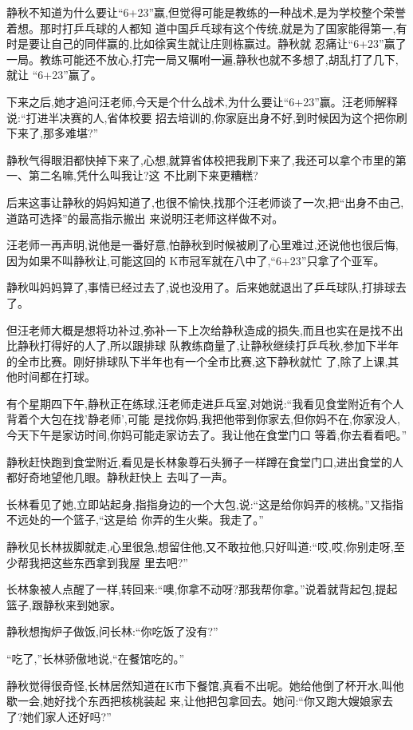 ﻿\documentclass[12pt]{article}
\begin{document}
静秋不知道为什么要让``6+23''赢,但觉得可能是教练的一种战术,是为学校整个荣誉着想。那时打乒乓球的人都知
道中国乒乓球有这个传统,就是为了国家能得第一,有时是要让自己的同伴赢的,比如徐寅生就让庄则栋赢过。静秋就
忍痛让``6+23''赢了一局。教练可能还不放心,打完一局又嘱咐一遍,静秋也就不多想了,胡乱打了几下,就让
``6+23''赢了。

下来之后,她才追问汪老师,今天是个什么战术,为什么要让``6+23''赢。汪老师解释说:``打进半决赛的人,省体校要
招去培训的,你家庭出身不好,到时候因为这个把你刷下来了,那多难堪?''

静秋气得眼泪都快掉下来了,心想,就算省体校把我刷下来了,我还可以拿个市里的第一、第二名嘛,凭什么叫我让?这
不比刷下来更糟糕?

后来这事让静秋的妈妈知道了,也很不愉快,找那个汪老师谈了一次,把``出身不由己,道路可选择''的最高指示搬出
来说明汪老师这样做不对。

汪老师一再声明,说他是一番好意,怕静秋到时候被刷了心里难过,还说他也很后悔,因为如果不叫静秋让,可能这回的
K市冠军就在八中了,``6+23''只拿了个亚军。

静秋叫妈妈算了,事情已经过去了,说也没用了。后来她就退出了乒乓球队,打排球去了。

但汪老师大概是想将功补过,弥补一下上次给静秋造成的损失,而且也实在是找不出比静秋打得好的人了,所以跟排球
队教练商量了,让静秋继续打乒乓秋,参加下半年的全市比赛。刚好排球队下半年也有一个全市比赛,这下静秋就忙
了,除了上课,其他时间都在打球。

有个星期四下午,静秋正在练球,汪老师走进乒乓室,对她说:``我看见食堂附近有个人背着个大包在找'静老师',可能
是找你妈,我把他带到你家去,但你妈不在,你家没人,今天下午是家访时间,你妈可能走家访去了。我让他在食堂门口
等着,你去看看吧。''

静秋赶快跑到食堂附近,看见是长林象尊石头狮子一样蹲在食堂门口,进出食堂的人都好奇地望他几眼。静秋赶快上
去叫了一声。

长林看见了她,立即站起身,指指身边的一个大包,说:``这是给你妈弄的核桃。''又指指不远处的一个篮子,``这是给
你弄的生火柴。我走了。''

静秋见长林拔脚就走,心里很急,想留住他,又不敢拉他,只好叫道:``哎,哎,你别走呀,至少帮我把这些东西拿到我屋
里去吧?''

长林象被人点醒了一样,转回来:``噢,你拿不动呀?那我帮你拿。''说着就背起包,提起篮子,跟静秋来到她家。

静秋想掏炉子做饭,问长林:``你吃饭了没有?''

``吃了,''长林骄傲地说,``在餐馆吃的。''

静秋觉得很奇怪,长林居然知道在K市下餐馆,真看不出呢。她给他倒了杯开水,叫他歇一会,她好找个东西把核桃装起
来,让他把包拿回去。她问:``你\myrule 又跑大嫂娘家去了?她们家人还好吗?''
\end{document}
